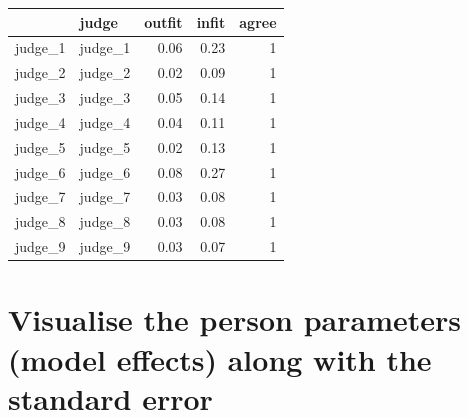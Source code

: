 \documentclass[
  letterpaper,
  DIV=11,
  numbers=noendperiod]{scrreprt}
\newenvironment{Shaded}{\begin{snugshade}}{\end{snugshade}}
\newcommand{\AttributeTok}[1]{\textcolor[rgb]{0.40,0.45,0.13}{#1}}
\newcommand{\CommentTok}[1]{\textcolor[rgb]{0.37,0.37,0.37}{#1}}
\newcommand{\FloatTok}[1]{\textcolor[rgb]{0.68,0.00,0.00}{#1}}
\newcommand{\FunctionTok}[1]{\textcolor[rgb]{0.28,0.35,0.67}{#1}}
\newcommand{\NormalTok}[1]{\textcolor[rgb]{0.00,0.23,0.31}{#1}}
\newcommand{\OtherTok}[1]{\textcolor[rgb]{0.00,0.23,0.31}{#1}}
\newcommand{\SpecialCharTok}[1]{\textcolor[rgb]{0.37,0.37,0.37}{#1}}
\newcommand{\StringTok}[1]{\textcolor[rgb]{0.13,0.47,0.30}{#1}}
\begin{document}
\begin{longtable}[]{@{}llrrr@{}}
\toprule\noalign{}
& judge & outfit & infit & agree \\
\midrule\noalign{}
\endhead
\bottomrule\noalign{}
\endlastfoot
judge\_1 & judge\_1 & 0.06 & 0.23 & 1 \\
judge\_2 & judge\_2 & 0.02 & 0.09 & 1 \\
judge\_3 & judge\_3 & 0.05 & 0.14 & 1 \\
judge\_4 & judge\_4 & 0.04 & 0.11 & 1 \\
judge\_5 & judge\_5 & 0.02 & 0.13 & 1 \\
judge\_6 & judge\_6 & 0.08 & 0.27 & 1 \\
judge\_7 & judge\_7 & 0.03 & 0.08 & 1 \\
judge\_8 & judge\_8 & 0.03 & 0.08 & 1 \\
judge\_9 & judge\_9 & 0.03 & 0.07 & 1 \\
\end{longtable}

\hypertarget{visualise-the-person-parameters-model-effects-along-with-the-standard-error}{%
\section{Visualise the person parameters (model effects) along with the
standard
error}\label{visualise-the-person-parameters-model-effects-along-with-the-standard-error}}

\begin{Shaded}
\end{Shaded}
\end{document}
